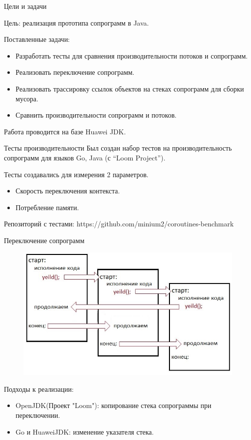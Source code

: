 \begin{frame}{Цели и задачи}
	
	Цель: реализация прототипа сопрограмм в Java.
	\par
	Поставленные задачи:
	\begin{itemize}
		\item Разработать тесты для сравнения производительности потоков и сопрограмм.
		\item Реализовать переключение сопрограмм.
		\item Реализовать трассировку ссылок объектов на стеках сопрограмм для сборки мусора.
		\item Сравнить производительности сопрограмм и потоков. 
	\end{itemize}

	Работа проводится на базе Huawei JDK.
\end{frame}

\begin{frame}{Тесты производительности}
	Был создан набор тестов на производительность сопрограмм для языков Go, Java (с “Loom Project”).
	
	Тесты создавались для измерения 2 параметров.
	\begin{itemize}
		\item Скорость переключения контекста.
		\item Потребление памяти.
	\end{itemize}
	Репозиторий с тестами: https://github.com/minium2/coroutines-benchmark
	
\end{frame}

\begin{frame}{Переключение сопрограмм}
	\begin{figure}
		\includegraphics[scale=0.5]{images/scheme.jpg}
	\end{figure}
	\par
	Подходы к реализации:
	\begin{itemize}
		\item OpenJDK(Проект "Loom"): копирование стека сопрограммы при переключении.
		\item Go и HuaweiJDK: изменение указателя стека.
	\end{itemize}
\end{frame}

